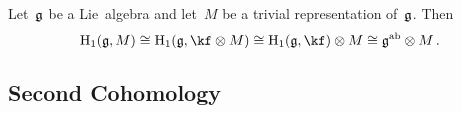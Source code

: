 \begin{fluff}
  Let~$\mathfrak{g}$ be a Lie~algebra and let~$M$ be a trivial representation of~$\mathfrak{g}$.
  Then
  \[
    \Homology_1(\glie, M)
    \cong
    \Homology_1(\glie, \kf \otimes M)
    \cong
    \Homology_1(\glie, \kf) \otimes M
    \cong
    \glie^{\ab} \otimes M \,.
  \]
\end{fluff}





\subsection{Second Cohomology}


%
%
%  


